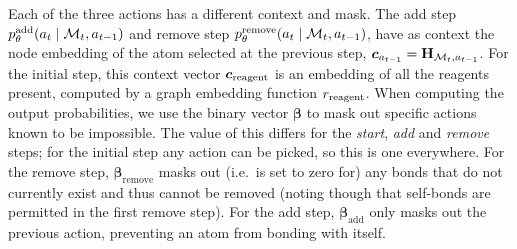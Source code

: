 Each of the three actions has a different context and mask.
The add step $p_\theta^\textrm{add}(a_t \mid {\mathcal{M}}_t, a_{t-1})$ and remove step $p_\theta^\textrm{remove}(a_t \mid {\mathcal{M}}_t, a_{t-1})$,
 have as context the node embedding of the atom selected at the previous step, $\bm{c}_{a_{t-1}} = {\mathbf{H}}_{{\mathcal{M}}_t, a_{t-1}}$. 
For the initial step, this context vector $\bm{c}_\mathrm{reagent}$ is an embedding of all the reagents present, computed %
by a graph embedding function $r_\mathrm{reagent}$.
When computing the output probabilities,
we use the binary vector $\bm{\beta}$ to mask out specific actions known to be impossible.
The value of this differs for the {\em start}, {\em add} and {\em remove} steps;
for the initial step any action can be picked, so this is one everywhere.
For the remove step, $\bm{\beta}_\mathrm{remove}$ masks out (i.e.\ is set to zero for) any bonds that do not currently exist and thus cannot be removed (noting though that self-bonds are permitted in the first remove step).
For the add step, $\bm{\beta}_\textrm{add}$ only masks out the previous action, preventing an atom from bonding with itself.



